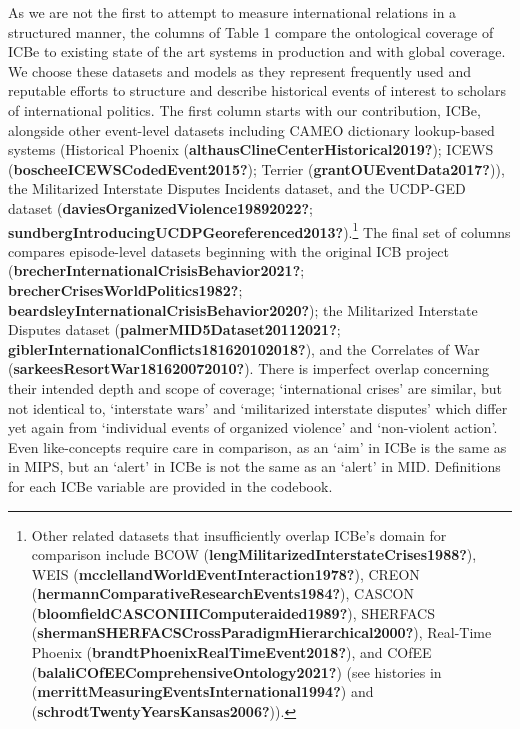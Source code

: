 \documentclass{article}
\begin{document}
As we are not the first to attempt to measure international relations in
a structured manner, the columns of Table 1 compare the ontological
coverage of ICBe to existing state of the art systems in production and
with global coverage. We choose these datasets and models as they
represent frequently used and reputable efforts to structure and
describe historical events of interest to scholars of international
politics. The first column starts with our contribution, ICBe, alongside
other event-level datasets including CAMEO dictionary lookup-based
systems (Historical Phoenix
(\textbf{althausClineCenterHistorical2019?}); ICEWS
(\textbf{boscheeICEWSCodedEvent2015?}); Terrier
(\textbf{grantOUEventData2017?})), the Militarized Interstate Disputes
Incidents dataset, and the UCDP-GED dataset
(\textbf{daviesOrganizedViolence19892022?};
\textbf{sundbergIntroducingUCDPGeoreferenced2013?}).\footnote{Other
  related datasets that insufficiently overlap ICBe's domain for
  comparison include BCOW
  (\textbf{lengMilitarizedInterstateCrises1988?}), WEIS
  (\textbf{mcclellandWorldEventInteraction1978?}), CREON
  (\textbf{hermannComparativeResearchEvents1984?}), CASCON
  (\textbf{bloomfieldCASCONIIIComputeraided1989?}), SHERFACS
  (\textbf{shermanSHERFACSCrossParadigmHierarchical2000?}), Real-Time
  Phoenix (\textbf{brandtPhoenixRealTimeEvent2018?}), and COfEE
  (\textbf{balaliCOfEEComprehensiveOntology2021?}) (see histories in
  (\textbf{merrittMeasuringEventsInternational1994?}) and
  (\textbf{schrodtTwentyYearsKansas2006?})).} The final set of columns
compares episode-level datasets beginning with the original ICB project
(\textbf{brecherInternationalCrisisBehavior2021?};
\textbf{brecherCrisesWorldPolitics1982?};
\textbf{beardsleyInternationalCrisisBehavior2020?}); the Militarized
Interstate Disputes dataset (\textbf{palmerMID5Dataset20112021?};
\textbf{giblerInternationalConflicts181620102018?}), and the Correlates
of War (\textbf{sarkeesResortWar181620072010?}). There is imperfect
overlap concerning their intended depth and scope of coverage;
`international crises' are similar, but not identical to, `interstate
wars' and `militarized interstate disputes' which differ yet again from
`individual events of organized violence' and `non-violent action'. Even
like-concepts require care in comparison, as an `aim' in ICBe is the
same as in MIPS, but an `alert' in ICBe is not the same as an `alert' in
MID. Definitions for each ICBe variable are provided in the codebook.

\clearpage
\singlespacing
\end{document}
